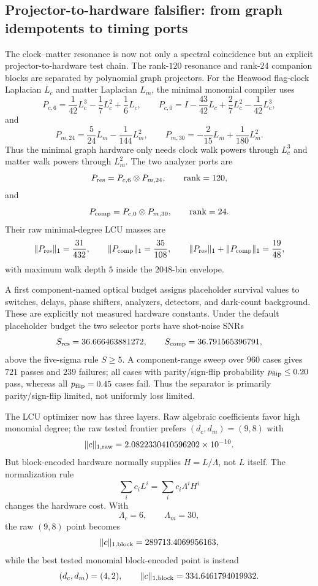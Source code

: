 \subsection{Projector-to-hardware falsifier: from graph idempotents to timing ports}
\label{sec:projector-hardware-falsifier}

The clock--matter resonance is now not only a spectral coincidence but an explicit
projector-to-hardware test chain.  The rank-$120$ resonance and rank-$24$
companion blocks are separated by polynomial graph projectors.  For the Heawood
flag-clock Laplacian $L_c$ and matter Laplacian $L_m$, the minimal monomial
compiler uses
\[
P_{c,6}=\frac{1}{42}L_c^3-\frac17L_c^2+\frac16L_c,
\qquad
P_{c,0}=I-\frac{43}{42}L_c+\frac27L_c^2-\frac{1}{42}L_c^3,
\]
and
\[
P_{m,24}=\frac{5}{24}L_m-\frac{1}{144}L_m^2,
\qquad
P_{m,30}=-\frac{2}{15}L_m+\frac{1}{180}L_m^2.
\]
Thus the minimal graph hardware only needs clock walk powers through $L_c^3$ and
matter walk powers through $L_m^2$.  The two analyzer ports are
\[
P_{\rm res}=P_{c,6}\otimes P_{m,24},\qquad \mathrm{rank}=120,
\]
and
\[
P_{\rm comp}=P_{c,0}\otimes P_{m,30},\qquad \mathrm{rank}=24.
\]
Their raw minimal-degree LCU masses are
\[
\|P_{\rm res}\|_1=\frac{31}{432},\qquad
\|P_{\rm comp}\|_1=\frac{35}{108},\qquad
\|P_{\rm res}\|_1+\|P_{\rm comp}\|_1=\frac{19}{48},
\]
with maximum walk depth $5$ inside the $2048$-bin envelope.

A first component-named optical budget assigns placeholder survival values to
switches, delays, phase shifters, analyzers, detectors, and dark-count background.
These are explicitly not measured hardware constants.  Under the default
placeholder budget the two selector ports have shot-noise SNRs
\[
S_{\rm res}=36.666463881272,
\qquad
S_{\rm comp}=36.791565396791,
\]
above the five-sigma rule $S\ge5$.  A component-range sweep over $960$ cases gives
$721$ passes and $239$ failures; all cases with parity/sign-flip probability
$p_{\rm flip}\le0.20$ pass, whereas all $p_{\rm flip}=0.45$ cases fail.  Thus the
separator is primarily parity/sign-flip limited, not uniformly loss limited.

The LCU optimizer now has three layers.  Raw algebraic coefficients favor high
monomial degree; the raw tested frontier prefers $(d_c,d_m)=(9,8)$ with
\[
\|c\|_{1,\rm raw}=2.0822330410596202\times10^{-10}.
\]
But block-encoded hardware normally supplies $H=L/\Lambda$, not $L$ itself.  The
normalization rule
\[
\sum_i c_iL^i=\sum_i c_i\Lambda^iH^i
\]
changes the hardware cost.  With
\[
\Lambda_c=6,
\qquad
\Lambda_m=30,
\]
the raw $(9,8)$ point becomes
\[
\|c\|_{1,\rm block}=289713.4069956163,
\]
while the best tested monomial block-encoded point is instead
\[
(d_c,d_m)=(4,2),
\qquad
\|c\|_{1,\rm block}=334.6461794019932.
\]

